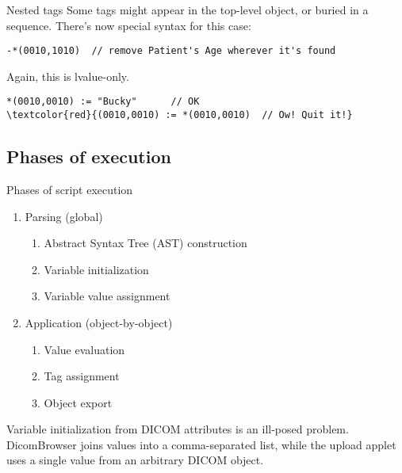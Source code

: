 \documentclass{beamer}  %
\begin{document}
\begin{frame}[fragile]{Nested tags}
Some tags might appear in the top-level object, or buried in a sequence.
There's now special syntax for this case:

\scriptsize
\begin{verbatim}
-*(0010,1010)  // remove Patient's Age wherever it's found
\end{verbatim}

\pause
\normalsize
Again, this is lvalue-only.
\scriptsize
\begin{Verbatim}[commandchars=\\\{\}]
*(0010,0010) := "Bucky"      // OK
\textcolor{red}{(0010,0010) := *(0010,0010)  // Ow! Quit it!}
\end{Verbatim}
\end{frame}

\subsection{Phases of execution}
\begin{frame}[fragile]{Phases of script execution}
\begin{enumerate}
\item Parsing (global)
  \begin{enumerate}[i]
    \pause
    \item Abstract Syntax Tree (AST) construction
    \pause
    \item Variable initialization
    \pause
    \item Variable value assignment
  \end{enumerate}
\pause
\item Application (object-by-object)
  \begin{enumerate}[i]
    \pause
    \item Value evaluation
    \pause
    \item Tag assignment
    \pause
    \item Object export
  \end{enumerate}
\end{enumerate}

\pause
Variable initialization from DICOM attributes is an ill-posed
problem. DicomBrowser joins values into a comma-separated list, while
the upload applet uses a single value from an arbitrary DICOM object.

\end{frame}
\end{document}
